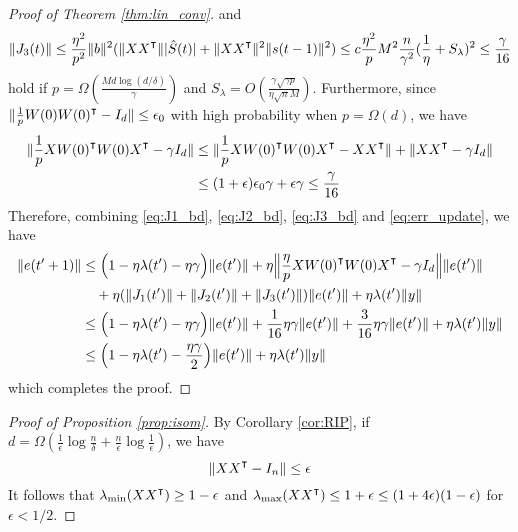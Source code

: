 \begin{proof}[Proof of Theorem \ref{thm:lin_conv}]
and
\begin{equation}
\label{eq:J3_bd}
\|J_3(t)\| \leq \frac{\eta^2}{p^2}\|b\|^2(\|XX\transpose\| |\hat{S}(t)|+\|XX\transpose\|^2 \|s(t-1)\|^2) \leq c\frac{\eta^2}{p}M^2 \frac{n}{\gamma^2}(\frac{1}{\eta}+S_\lambda)^2\leq \frac{\gamma}{16}
\end{equation}
hold if $p = \Omega(\frac{Md\log(d/\delta)}{\gamma})$ and $S_\lambda = O(\frac{\gamma\sqrt{\gamma p}}{\eta\sqrt{n}M})$. Furthermore, since $\|\frac{1}{p}W(0)W(0)\transpose-I_d\|\leq \epsilon_0$ with high probability when $p=\Omega(d)$, we have
\begin{equation}
\label{eq:xwwx_bd}
\begin{aligned}
\|\frac{1}{p}XW(0)\transpose W(0)X\transpose-\gamma I_d\| 
&\leq \|\frac{1}{p}XW(0)\transpose W(0)X\transpose-XX\transpose\| + \|XX\transpose-\gamma I_d\|  \\
&\leq (1+\epsilon)\epsilon_0\gamma+\epsilon\gamma \leq \frac{\gamma}{16}
\end{aligned}
\end{equation}
Therefore, combining \eqref{eq:J1_bd}, \eqref{eq:J2_bd}, \eqref{eq:J3_bd} and \eqref{eq:err_update}, we have
\begin{equation*}
\begin{aligned}
       \|e(t'+1)\|
       &\leq \Big(1-\eta\lambda(t')-\eta\gamma\Big) \|e(t')\| + \eta\Big\|\frac{\eta}{p}XW(0)\transpose W(0)X\transpose-\gamma I_d\Big\|\|e(t')\|\\
       &\quad + \eta(\|J_1(t')\|+\|J_2(t')\|+\|J_3(t')\|)\|e(t')\| + \eta\lambda(t')\|y\| \\ 
       &\leq \Big(1-\eta\lambda(t')-\eta\gamma\Big)\|e(t')\| + \frac{1}{16}\eta\gamma\|e(t')\|+ \frac{3}{16}\eta\gamma\|e(t')\|  + \eta\lambda(t')\|y\| \\
       &\leq\Big(1-\eta\lambda(t')-\frac{\eta\gamma}{2}\Big)\|e(t')\| +  \eta\lambda(t')\|y\| 
\end{aligned}
\end{equation*}
which completes the proof. 
\end{proof} 


\begin{proof}[Proof of Proposition \ref{prop:isom}]
By Corollary \ref{cor:RIP}, if $d=\Omega(\frac{1}{\epsilon}\log\frac{n}{\delta}+\frac{n}{\epsilon}\log \frac{1}{\epsilon})$, we have 
\begin{equation*}
\|XX\transpose - I_n\|\leq \epsilon 
\end{equation*}
It follows that $\lambda_{\min}(XX\transpose)\geq 1-\epsilon$ and $\lambda_{\max}(XX\transpose)\leq 1+\epsilon \leq (1+4\epsilon)(1-\epsilon)$ for $\epsilon <1/2$.
\end{proof}


